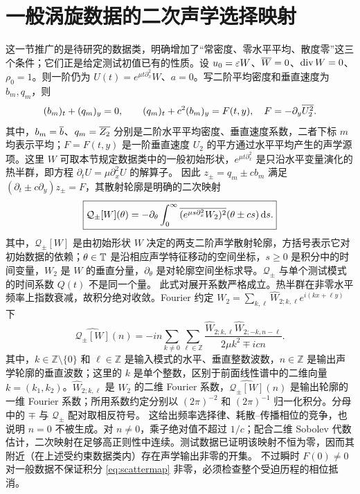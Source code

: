 \section{一般涡旋数据的二次声学选择映射}
这一节推广的是待研究的数据类，明确增加了“常密度、零水平平均、散度零”这三个条件；它们正是给定测试初值已有的性质。设 $u_0=\varepsilon W$、$\overline{W}=0$、$\operatorname{div} W=0$、$\rho_0=1$。则一阶仍为
$U(t)=e^{\mu t\partial_x^2}W$、$a=0$。写二阶平均密度和垂直速度为 $b_m,q_m$，则
\begin{equation}\label{eq:generalmean}
 (b_m)_t+(q_m)_y=0,\qquad
 (q_m)_t+c^2(b_m)_y=F(t,y),\quad
 F=-\partial_y\overline{U_2^2}.
\end{equation}
其中，$b_m=\overline{b}$、$q_m=\overline{Z_2}$ 分别是二阶水平平均密度、垂直速度系数，二者下标 $m$ 均表示平均；$F=F(t,y)$ 是一阶垂直速度 $U_2$ 的平方通过水平平均产生的声学源项。这里 $W$ 可取本节规定数据类中的一般初始形状，$e^{\mu t\partial_x^2}$ 是只沿水平变量演化的热半群，即方程 $\partial_tU=\mu\partial_x^2U$ 的解算子。
因此 $z_\pm=q_m\pm cb_m$ 满足 $(\partial_t\pm c\partial_y)z_\pm=F$，其散射轮廓是明确的二次映射
\begin{equation}\label{eq:scattermap}
 \boxed{\mathcal Q_\pm[W](\theta)
 =-\partial_\theta\int_0^\infty
 \overline{(e^{\mu s\partial_x^2}W_2)^2}(\theta\pm cs)\,\mathrm d s.}
\end{equation}
其中，$\mathcal Q_\pm[W]$ 是由初始形状 $W$ 决定的两支二阶声学散射轮廓，方括号表示它对初始数据的依赖；$\theta\in\mathbb T$ 是沿相应声学特征移动的空间坐标，$s\ge0$ 是积分中的时间变量，$W_2$ 是 $W$ 的垂直分量，$\partial_\theta$ 是对轮廓空间坐标求导。$\mathcal Q_\pm$ 与单个测试模式的时间系数 $Q(t)$ 不是同一个量。
此式对展开系数严格成立。热半群在非零水平频率上指数衰减，故积分绝对收敛。Fourier 约定 $W_2=\sum_{k,\ell}\widehat W_{2;k,\ell}e^{i(kx+\ell y)}$ 下
\begin{equation}\label{eq:multiplier}
 \widehat{\mathcal Q_\pm[W]}(n)
 =-in\sum_{k\ne0}\sum_{\ell\in\mathbb Z}
 \frac{\widehat W_{2;k,\ell}\widehat W_{2;-k,n-\ell}}
 {2\mu k^2\mp icn}.
\end{equation}
其中，$k\in\mathbb Z\setminus\{0\}$ 和 $\ell\in\mathbb Z$ 是输入模式的水平、垂直整数波数，$n\in\mathbb Z$ 是输出声学轮廓的垂直波数；这里的 $k$ 是单个整数，区别于前面线性谱中的二维向量 $k=(k_1,k_2)$。$\widehat W_{2;k,\ell}$ 是 $W_2$ 的二维 Fourier 系数，$\widehat{\mathcal Q_\pm[W]}(n)$ 是输出轮廓的一维 Fourier 系数；所用系数约定分别以 $(2\pi)^{-2}$ 和 $(2\pi)^{-1}$ 归一化积分。分母中的 $\mp$ 与 $\mathcal Q_\pm$ 配对取相反符号。
这给出频率选择律、耗散--传播相位的竞争，也说明 $n=0$ 不被生成。对 $n\ne0$，乘子绝对值不超过 $1/c$；配合二维 Sobolev 代数估计，二次映射在足够高正则性中连续。测试数据已证明该映射不恒为零，因而其附近（在上述受约束数据类内）存在声学输出非零的开集。
不过瞬时 $F(0)\ne0$ 对一般数据不保证积分 \eqref{eq:scattermap} 非零，必须检查整个受迫历程的相位抵消。

